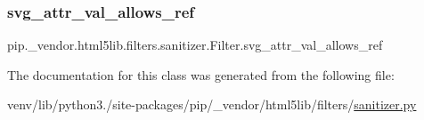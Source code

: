 \subsubsection{\texorpdfstring{svg\+\_\+attr\+\_\+val\+\_\+allows\+\_\+ref}{svg\_attr\_val\_allows\_ref}}
{\footnotesize\ttfamily pip.\+\_\+vendor.\+html5lib.\+filters.\+sanitizer.\+Filter.\+svg\+\_\+attr\+\_\+val\+\_\+allows\+\_\+ref}



The documentation for this class was generated from the following file\+:\begin{DoxyCompactItemize}
\item 
venv/lib/python3./site-\/packages/pip/\+\_\+vendor/html5lib/filters/\hyperlink{sanitizer_8py}{sanitizer.\+py}\end{DoxyCompactItemize}

